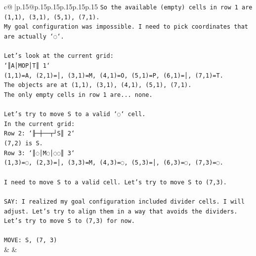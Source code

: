 \documentclass{article}
\begin{document}
{\begin{supertabular}{c@{$\;$}|p{.15\linewidth}@{}p{.15\linewidth}p{.15\linewidth}p{.15\linewidth}p{.15\linewidth}p{.15\linewidth}}
{{{\texttt{So the available (empty) cells in row 1 are (1,1), (3,1), (5,1), (7,1).} \\
\texttt{My goal configuration was impossible. I need to pick coordinates that are actually `◌`.} \\
\\ 
\texttt{Let's look at the current grid:} \\
\texttt{`║A│MOP│T║ 1`} \\
\texttt{(1,1)=A, (2,1)=│, (3,1)=M, (4,1)=O, (5,1)=P, (6,1)=│, (7,1)=T.} \\
\texttt{The objects are at (1,1), (3,1), (4,1), (5,1), (7,1).} \\
\texttt{The only empty cells in row 1 are... none.} \\
\\ 
\texttt{Let's try to move S to a valid `◌` cell.} \\
\texttt{In the current grid:} \\
\texttt{Row 2: `╟─┼──┬┘S║ 2`} \\
\texttt{(7,2) is S.} \\
\texttt{Row 3: `║◌│M◌│◌◌║ 3`} \\
\texttt{(1,3)=◌, (2,3)=│, (3,3)=M, (4,3)=◌, (5,3)=│, (6,3)=◌, (7,3)=◌.} \\
\\ 
\texttt{I need to move S to a valid cell. Let's try to move S to (7,3).} \\
\\ 
\texttt{SAY: I realized my goal configuration included divider cells. I will adjust. Let's try to align them in a way that avoids the dividers. Let's try to move S to (7,3) for now.} \\
\\ 
\texttt{MOVE: S, (7, 3)} \\
            }
        }
    }
    & & \\ \\


\end{supertabular}}
\end{document}
